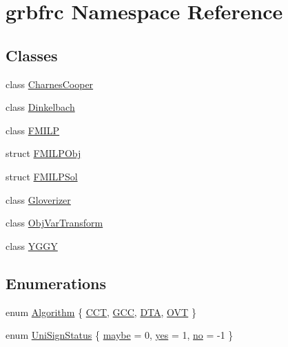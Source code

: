 \hypertarget{namespacegrbfrc}{}\section{grbfrc Namespace Reference}
\label{namespacegrbfrc}
\subsection*{Classes}
\begin{DoxyCompactItemize}
\item 
class \hyperlink{classgrbfrc_1_1CharnesCooper}{Charnes\+Cooper}
\item 
class \hyperlink{classgrbfrc_1_1Dinkelbach}{Dinkelbach}
\item 
class \hyperlink{classgrbfrc_1_1FMILP}{F\+M\+I\+LP}
\item 
struct \hyperlink{structgrbfrc_1_1FMILPObj}{F\+M\+I\+L\+P\+Obj}
\item 
struct \hyperlink{structgrbfrc_1_1FMILPSol}{F\+M\+I\+L\+P\+Sol}
\item 
class \hyperlink{classgrbfrc_1_1Gloverizer}{Gloverizer}
\item 
class \hyperlink{classgrbfrc_1_1ObjVarTransform}{Obj\+Var\+Transform}
\item 
class \hyperlink{classgrbfrc_1_1YGGY}{Y\+G\+GY}
\end{DoxyCompactItemize}
\subsection*{Enumerations}
\begin{DoxyCompactItemize}
\item 
enum \hyperlink{namespacegrbfrc_a032175e688b11ec611d637a145c6dfc3}{Algorithm} \{ \hyperlink{namespacegrbfrc_a032175e688b11ec611d637a145c6dfc3a7a3dc84f4b5dee22f5ddc0a8708214d5}{C\+CT}, 
\hyperlink{namespacegrbfrc_a032175e688b11ec611d637a145c6dfc3a4cfde7623d2723d84c4552806a8d543c}{G\+CC}, 
\hyperlink{namespacegrbfrc_a032175e688b11ec611d637a145c6dfc3a1f1ced79e9527979a81825b883a12876}{D\+TA}, 
\hyperlink{namespacegrbfrc_a032175e688b11ec611d637a145c6dfc3a9d2be8ea4ca5efafa3d84c86af92b50a}{O\+VT}
 \}
\item 
enum \hyperlink{namespacegrbfrc_a26ee84e31d7fae9e033413a2a5e1f0ca}{Uni\+Sign\+Status} \{ \hyperlink{namespacegrbfrc_a26ee84e31d7fae9e033413a2a5e1f0caa72f64e32ca10c102c70c6001ce86cf88}{maybe} = 0, 
\hyperlink{namespacegrbfrc_a26ee84e31d7fae9e033413a2a5e1f0caaa21c1cd93fb385635c35556848befb75}{yes} = 1, 
\hyperlink{namespacegrbfrc_a26ee84e31d7fae9e033413a2a5e1f0caa260830aae0582bc79704895c876ea411}{no} = -\/1
 \}
\end{DoxyCompactItemize}


